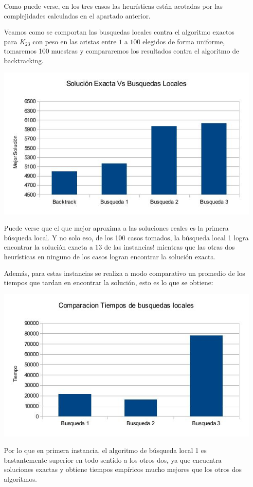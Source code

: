Como puede verse, en los tres casos las heurísticas están acotadas por las complejidades calculadas en el apartado anterior.

Veamos como se comportan las busquedas locales contra el algoritmo exactos para $K_23$ con peso en las aristas entre $1$ a $100$ elegidos de forma uniforme, tomaremos 100 muestras y compararemos los resultados contra el algoritmo de backtracking.

\includegraphics[scale=0.5]{Ej4/solucionestodos.jpg}

Puede verse que el que mejor aproxima a las soluciones reales es la primera búsqueda local. Y no solo eso, de los 100 casos tomados, la búsqueda local 1 logra encontrar la solución exacta a 13 de las instancias! mientras que las otras dos heurísticas en ninguno de los casos logran encontrar la solución exacta.

Además, para estas instancias se realiza a modo comparativo un promedio de los tiempos que tardan en encontrar la solución, esto es lo que se obtiene:

\includegraphics[scale=0.5]{Ej4/tiempotodos.jpg}

Por lo que en primera instancia, el algoritmo de búsqueda local 1 es bastantemente superior en todo sentido a los otros dos, ya que encuentra soluciones exactas y obtiene tiempos empíricos mucho mejores que los otros dos algoritmos.
